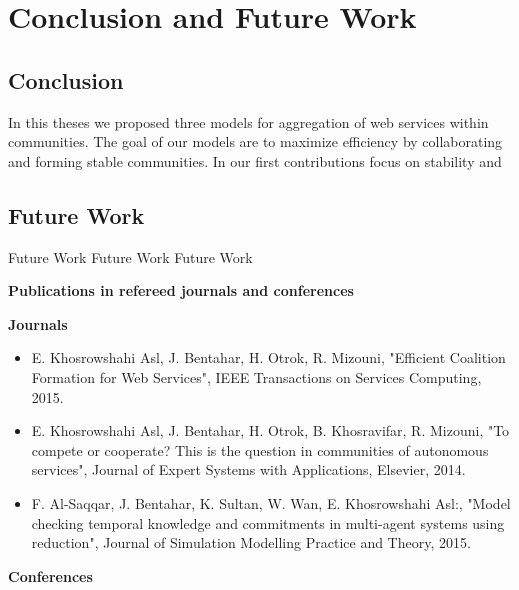 \chapter{Conclusion and Future Work}\label{Chap5:Conclusion}

\section{Conclusion}

In this theses we proposed three models for aggregation of web services within communities. The goal of our models are to maximize efficiency by collaborating and forming stable communities. In our first contributions focus on stability and 

\section{Future Work}

Future Work Future Work Future Work

\newpage
\textbf{Publications in refereed journals and conferences}

\textbf{Journals}

\begin{itemize}
\item E. Khosrowshahi Asl, J. Bentahar, H. Otrok, R. Mizouni, "Efficient Coalition Formation for Web Services", IEEE Transactions on Services Computing, 2015.

\item E. Khosrowshahi Asl, J. Bentahar, H. Otrok, B. Khosravifar, R. Mizouni, "To compete or cooperate? This is the question in communities of autonomous services", Journal of Expert Systems with Applications, Elsevier, 2014.
    
\item F. Al-Saqqar, J. Bentahar, K. Sultan, W. Wan, E. Khosrowshahi Asl:, "Model checking temporal knowledge and commitments in multi-agent systems using reduction", Journal of Simulation Modelling Practice and Theory, 2015.
    
\end{itemize}

\textbf{Conferences}

